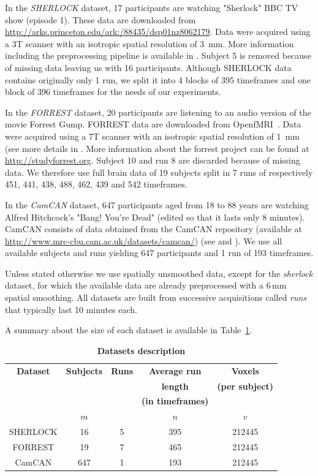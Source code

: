 In the \emph{SHERLOCK} dataset, 17 participants are watching "Sherlock" BBC TV show (episode 1). 
% 
These data are downloaded from \url{http://arks.princeton.edu/ark:/88435/dsp01nz8062179}. 
% 
Data were acquired using a 3T scanner with an isotropic spatial resolution of 3 mm. 
% 
More information including the preprocessing pipeline is available in \cite{sherlock}.
% 
Subject 5 is removed because of missing data leaving us with 16 participants.
% 
Although SHERLOCK data contains originally only 1 run, we split it into 4 blocks of 395 timeframes and one block of 396 timeframes for the needs of our experiments. 

In the \emph{FORREST} dataset, 20 participants are listening to an audio version of the movie Forrest Gump.
% 
FORREST data are downloaded from OpenfMRI~\cite{poldrack2013toward}. 
% 
Data were acquired using a 7T scanner with an isotropic spatial resolution of 1 mm (see more details in \cite{hanke2014high}.
% 
More information about the forrest project can be found at \url{http://studyforrest.org}.
% 
Subject 10 and run 8 are discarded because of missing data.
% 
We therefore use full brain data of 19 subjects split in 7 runs of respectively 451, 441, 438, 488, 462, 439 and 542 timeframes.


In the \emph{CamCAN} dataset, 647 participants aged from 18 to 88 years are watching Alfred Hitchcock's "Bang! You're Dead" (edited so that it lasts only 8 minutes).
% 
CamCAN consists of data obtained from the CamCAN repository (available at \url{http://www.mrc-cbu.cam.ac.uk/datasets/camcan/}) (see \cite{taylor2017cambridge} and \cite{shafto2014cambridge}).
% 
We use all available subjects and runs yielding 647 participants and 1 run of 193 timeframes.


Unless stated otherwise we use spatially unsmoothed data, except for the \emph{sherlock} dataset, for which the available data are already preprocessed with a 6\,mm spatial smoothing. All datasets are built from successive acquisitions called \emph{runs} that typically last 10 minutes each.
%

A summary about the size of each dataset is available in Table~\ref{tab:dataset_desc}.
\begin{table}
	\begin{tabular}{|c|c|c|c|c|}
		\hline
		\textbf{Dataset} & \textbf{Subjects} & \textbf{Runs} & \textbf{Average run} & \textbf{Voxels} \\
                     && & \textbf{length} & \textbf{(per subject)} \\
                     && & \textbf{(in timeframes)} &  \\
                     &$m$& $ $ & $n$ &$v$  \\
		\hline
		SHERLOCK & 16 & 5 & 395 & 212445 \\ 
		\hline
		FORREST & 19 & 7 & 465 & 212445\\
		\hline
		CamCAN & 647 & 1 & 193 & 212445 \\
		\hline
	\end{tabular}
  \caption{\textbf{Datasets description}}
  \label{tab:dataset_desc}
\end{table}

